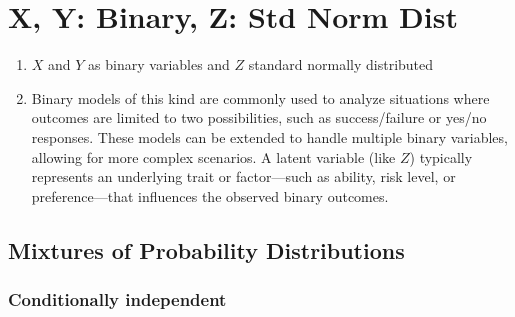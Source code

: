 \section{X, Y: Binary, Z: Std Norm Dist}

\begin{enumerate}
    \item $X$ and $Y$ as binary variables and $Z$ standard normally distributed
    \hfill \cite{statistics/book/Statistics-for-Data-Scientists/Maurits-Kaptein}

    \item Binary models of this kind are commonly used to analyze situations where outcomes are limited to two possibilities, such as success/failure or yes/no responses. 
    These models can be extended to handle multiple binary variables, allowing for more complex scenarios. 
    A latent variable (like $Z$) typically represents an underlying trait or factor—such as ability, risk level, or preference—that influences the observed binary outcomes.
    \hfill \cite{statistics/book/Statistics-for-Data-Scientists/Maurits-Kaptein, common/online/chatgpt}
\end{enumerate}




\subsection{Mixtures of Probability Distributions}

\subsubsection{Conditionally independent}

